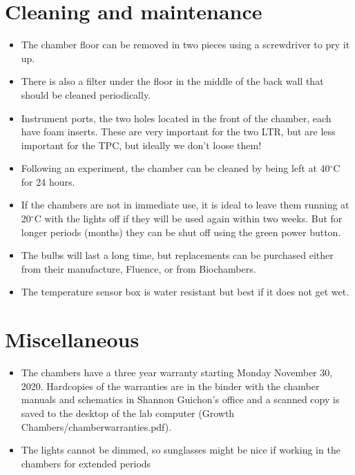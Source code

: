 \documentclass[11pt,a4paper,oneside]{article}
\begin{document}
\section{Cleaning and maintenance} 
\begin{itemize}
\item The chamber floor can be removed in two pieces using a screwdriver to pry it up. 
\item There is also a filter under the floor in the middle of the back wall that should be cleaned periodically. 
\item Instrument ports, the two holes located in the front of the chamber, each have foam inserts. These are very important for the two LTR, but are less important for the TPC, but ideally we don't loose them!
\item Following an experiment, the chamber can be cleaned by being left at 40$^\circ$C for 24 hours. 
\item If the chambers are not in immediate use, it is ideal to leave them running at 20$^\circ$C with the lights off if they will be used again within two weeks. But for longer periods (months) they can be shut off using the green power button. 
\item The bulbs will last a long time, but replacements can be purchased either from their manufacture, Fluence, or from Biochambers.
\item The temperature sensor box is water resistant but best if it does not get wet.
\end{itemize}

\section{Miscellaneous}
\begin{itemize}
\item The chambers have a three year warranty starting Monday November 30, 2020. Hardcopies of the warranties are in the binder with the chamber manuals and schematics in Shannon Guichon's office and a scanned copy is saved to the desktop of the lab computer (Growth Chambers/chamberwarranties.pdf).

\item The lights cannot be dimmed, so sunglasses might be nice if working in the chambers for extended periods
\end{itemize}
\end{document}
